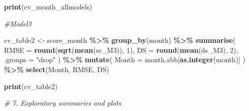 \documentclass[
]{article}
\newenvironment{Shaded}{\begin{snugshade}}{\end{snugshade}}
\newcommand{\AttributeTok}[1]{\textcolor[rgb]{0.13,0.29,0.53}{#1}}
\newcommand{\CommentTok}[1]{\textcolor[rgb]{0.56,0.35,0.01}{\textit{#1}}}
\newcommand{\DecValTok}[1]{\textcolor[rgb]{0.00,0.00,0.81}{#1}}
\newcommand{\FunctionTok}[1]{\textcolor[rgb]{0.13,0.29,0.53}{\textbf{#1}}}
\newcommand{\NormalTok}[1]{#1}
\newcommand{\OtherTok}[1]{\textcolor[rgb]{0.56,0.35,0.01}{#1}}
\newcommand{\SpecialCharTok}[1]{\textcolor[rgb]{0.81,0.36,0.00}{\textbf{#1}}}
\newcommand{\StringTok}[1]{\textcolor[rgb]{0.31,0.60,0.02}{#1}}
\begin{document}
\begin{Shaded}
\begin{Highlighting}[]
\FunctionTok{print}\NormalTok{(cv\_month\_allmodels)}

\CommentTok{\#Model3 }

\NormalTok{cv\_table2 }\OtherTok{\textless{}{-}}\NormalTok{ score\_month }\SpecialCharTok{\%\textgreater{}\%}
  \FunctionTok{group\_by}\NormalTok{(month) }\SpecialCharTok{\%\textgreater{}\%}
  \FunctionTok{summarise}\NormalTok{(}
    \AttributeTok{RMSE =} \FunctionTok{round}\NormalTok{(}\FunctionTok{sqrt}\NormalTok{(}\FunctionTok{mean}\NormalTok{(se\_M3)), }\DecValTok{1}\NormalTok{),}
    \AttributeTok{DS   =} \FunctionTok{round}\NormalTok{(}\FunctionTok{mean}\NormalTok{(ds\_M3), }\DecValTok{2}\NormalTok{),}
    \AttributeTok{.groups =} \StringTok{"drop"}
\NormalTok{  ) }\SpecialCharTok{\%\textgreater{}\%}
  \FunctionTok{mutate}\NormalTok{(}
    \AttributeTok{Month =}\NormalTok{ month.abb[}\FunctionTok{as.integer}\NormalTok{(month)]}
\NormalTok{  ) }\SpecialCharTok{\%\textgreater{}\%}
  \FunctionTok{select}\NormalTok{(Month, RMSE, DS)}

\FunctionTok{print}\NormalTok{(cv\_table2)}


\CommentTok{\# 7. Exploratory summaries and plots}


\end{Highlighting}
\end{Shaded}
\end{document}
